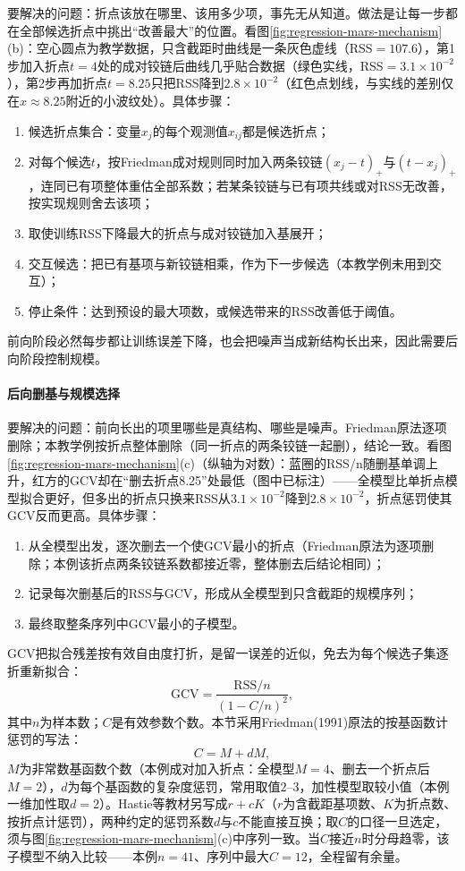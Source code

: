 要解决的问题：折点该放在哪里、该用多少项，事先无从知道。做法是让每一步都在全部候选折点中挑出“改善最大”的位置。看图\ref{fig:regression-mars-mechanism}(b)：空心圆点为教学数据，只含截距时曲线是一条灰色虚线（RSS$=107.6$），第1步加入折点$t=4$处的成对铰链后曲线几乎贴合数据（绿色实线，RSS$=3.1\times10^{-2}$），第2步再加折点$t=8.25$只把RSS降到$2.8\times10^{-2}$（红色点划线，与实线的差别仅在$x\approx8.25$附近的小波纹处）。具体步骤：
\begin{enumerate}
  \item 候选折点集合：变量$x_j$的每个观测值$x_{ij}$都是候选折点；
  \item 对每个候选$t$，按Friedman成对规则同时加入两条铰链$(x_j-t)_+$与$(t-x_j)_+$，连同已有项整体重估全部系数；若某条铰链与已有项共线或对RSS无改善，按实现规则舍去该项；
  \item 取使训练RSS下降最大的折点与成对铰链加入基展开；
  \item 交互候选：把已有基项与新铰链相乘，作为下一步候选（本教学例未用到交互）；
  \item 停止条件：达到预设的最大项数，或候选带来的RSS改善低于阈值。
\end{enumerate}
前向阶段必然每步都让训练误差下降，也会把噪声当成新结构长出来，因此需要后向阶段控制规模。

\paragraph{后向删基与规模选择}

要解决的问题：前向长出的项里哪些是真结构、哪些是噪声。Friedman原法逐项删除；本教学例按折点整体删除（同一折点的两条铰链一起删），结论一致。看图\ref{fig:regression-mars-mechanism}(c)（纵轴为对数）：蓝圈的RSS/n随删基单调上升，红方的GCV却在“删去折点8.25”处最低（图中已标注）——全模型比单折点模型拟合更好，但多出的折点只换来RSS从$3.1\times10^{-2}$降到$2.8\times10^{-2}$，折点惩罚使其GCV反而更高。具体步骤：
\begin{enumerate}
  \item 从全模型出发，逐次删去一个使GCV最小的折点（Friedman原法为逐项删除；本例该折点两条铰链系数都接近零，整体删去后结论相同）；
  \item 记录每次删基后的RSS与GCV，形成从全模型到只含截距的规模序列；
  \item 最终取整条序列中GCV最小的子模型。
\end{enumerate}
GCV把拟合残差按有效自由度打折，是留一误差的近似，免去为每个候选子集逐折重新拟合：
\begin{equation}
  \mathrm{GCV}=\frac{\mathrm{RSS}/n}{(1-C/n)^2},
  \label{eq:regression-mars-gcv}
\end{equation}
其中$n$为样本数；$C$是有效参数个数。本节采用Friedman(1991)原法的按基函数计惩罚的写法：
\[
  C=M+dM,
\]
$M$为非常数基函数个数（本例成对加入折点：全模型$M=4$、删去一个折点后$M=2$），$d$为每个基函数的复杂度惩罚，常用取值$2$--$3$，加性模型取较小值（本例一维加性取$d=2$）。Hastie等教材另写成$r+cK$（$r$为含截距基项数、$K$为折点数、按折点计惩罚），两种约定的惩罚系数$d$与$c$不能直接互换；取$C$的口径一旦选定，须与图\ref{fig:regression-mars-mechanism}(c)中序列一致。当$C$接近$n$时分母趋零，该子模型不纳入比较——本例$n=41$、序列中最大$C=12$，全程留有余量。

